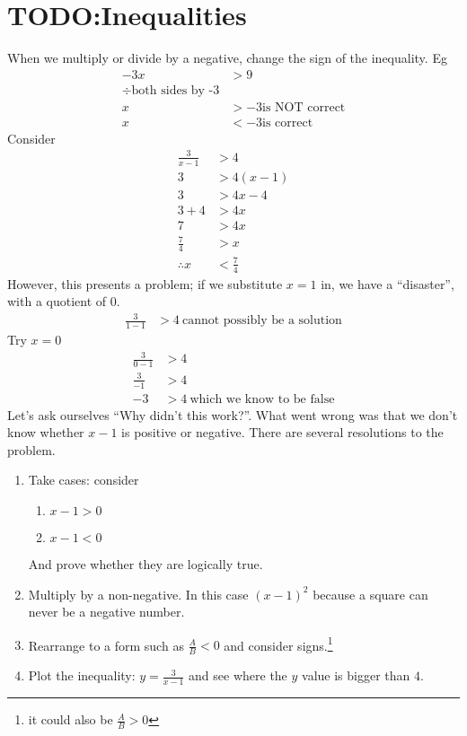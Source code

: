 \chapter{TODO:Inequalities}
\label{chap:Inequalities}
When we multiply or divide by a negative, change the sign of the inequality.
Eg
\begin{align}
  -3x & > 9 \\
  \div \text{both sides by -3} \nonumber \\
  x & > -3 \text{is NOT correct} \nonumber \\
  x & < -3 \text{is correct}
\end{align}
Consider
\begin{align}
  \frac{3}{x-1} & > 4 \\
  3 & > 4(x-1) \\
  3 & > 4x - 4 \\
  3 + 4 & > 4x \\
  7 & > 4x \\
  \frac{7}{4} & > x \\
  \therefore x & < \frac{7}{4}
\end{align}
However, this presents a problem; if we substitute $x=1$ in, we have a
``disaster'', with a quotient of $0$.
\begin{align}
  \frac{3}{1 - 1} & > 4~\text{cannot possibly be a solution}
\end{align}
Try $x=0$
\begin{align}
  \frac{3}{0 - 1} & > 4 \\
  \frac{3}{-1} & > 4 \\
  -3 & > 4~\text{which we know to be false}
\end{align}
Let's ask ourselves ``Why didn't this work?''. What went wrong was that we don't
know whether $x-1$ is positive or negative. There are several resolutions to the
problem.
\begin{enumerate}
  \item Take cases: consider
  \begin{enumerate}
    \item $x-1 > 0$
    \item $x-1 < 0$
  \end{enumerate}
  And prove whether they are logically true.
  \item Multiply by a non-negative. In this case $(x-1)^2$ because a square can
  never be a negative number.
  \item Rearrange to a form such as $\frac{A}{B} < 0$ and consider
  signs.\footnote{it could also be $\frac{A}{B} > 0$}
  \item Plot the inequality: $y = \frac{3}{x-1}$ and see where the $y$ value is
  bigger than $4$.
\end{enumerate}


